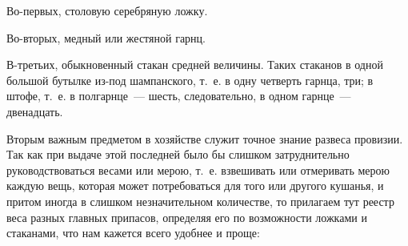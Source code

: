 Во-первых, столовую серебряную ложку.

Во-вторых, медный или жестяной гарнц.

В-третьих, обыкновенный стакан средней величины. Таких стаканов в одной большой бутылке из-под шампанского, т.~е. в одну четверть гарнца, три; в штофе, т.~е. в полгарнце~--- шесть, следовательно, в одном гарнце~--- двенадцать.

Вторым важным предметом в хозяйстве служит точное знание развеса провизии. Так как при выдаче этой последней было бы слишком затруднительно руководствоваться весами или мерою, т.~е. взвешивать или отмеривать мерою каждую вещь, которая может потребоваться для того или другого кушанья, и притом иногда в слишком незначительном количестве, то прилагаем тут реестр веса разных главных припасов, определяя его по возможности ложками и стаканами, что нам кажется всего удобнее и проще:

